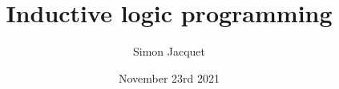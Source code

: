\documentclass{beamer}
\title[Inductive logic programming]{Inductive logic programming}
\subtitle{}
\author{Simon Jacquet}
\institute[Unamur]{Faculty of Computer Science\\Unamur}
\date{November 23rd 2021}
\begin{document}
\frame{\titlepage}



%
\end{document}
